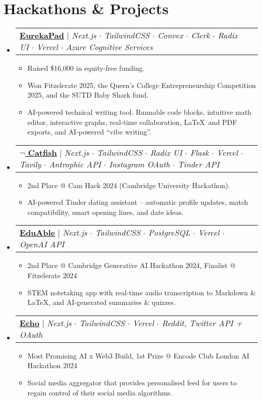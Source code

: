 \documentclass[letterpaper,10pt]{article}
\makeatletter
\newcommand{\link}[2]{\href{#1}{\color{blue}\underline{#2}}}
\newcommand{\resumeItem}[1]{
  \item\small{
    {#1 \vspace{-2pt}}
  }
}
\newcommand{\resumeProjectHeading}[2]{
  \item
  \begin{tabular*}{0.97\textwidth}{l@{\extracolsep{\fill}}r}
    \small#1 & #2 \\
  \end{tabular*}\vspace{-7pt}
}
\newenvironment{resumeSubHeadingList}{\begin{itemize}[leftmargin=0.15in, label={}]}{\end{itemize}}
\newenvironment{resumeItemList}{\begin{itemize}}{\end{itemize}}
\makeatother
\begin{document}
\section{Hackathons \& Projects}
\begin{resumeSubHeadingList}

  \resumeProjectHeading{
    \link{https://www.eurekapad.app/}{\textbf{EurekaPad}} $|$
    \emph{Next.js $\cdot$ TailwindCSS $\cdot$ Convex $\cdot$ Clerk $\cdot$
          Radix UI $\cdot$ Vercel $\cdot$ Azure Cognitive Services}}{}
  \begin{resumeItemList}
    \resumeItem{Raised \$16,000 in equity-free funding.}
    \resumeItem{Won Fitzelerate 2025, the Queen's College Entrepreneurship
                Competition 2025, and the SUTD Baby Shark fund.}
    \resumeItem{AI-powered technical writing tool. Runnable code blocks,
                intuitive math editor, interactive graphs, real-time
                collaboration, \LaTeX\ and PDF exports, and AI-powered ``vibe
                writing''.}
  \end{resumeItemList}

  \resumeProjectHeading{
    \link{https://github.com/zeyu2001/camhack-frontend}{\textbf{$\lnot$
          Catfish}} $|$
    \emph{Next.js $\cdot$ TailwindCSS $\cdot$ Radix UI $\cdot$ Flask $\cdot$
          Vercel $\cdot$ Tavily $\cdot$ Antrophic API $\cdot$ Instagram OAuth
          $\cdot$ Tinder API}}{}
  \begin{resumeItemList}
    \resumeItem{2nd Place @ Cam Hack 2024 (Cambridge University Hackathon).}
    \resumeItem{AI-powered Tinder dating assistant -- automatic profile
                updates, match compatibility, smart opening lines, and date
                ideas.}
  \end{resumeItemList}

  \newpage

  \resumeProjectHeading{
    \link{https://github.com/zeyu2001/EduAble}{\textbf{EduAble}} $|$
    \emph{Next.js $\cdot$ TailwindCSS $\cdot$ PostgreSQL $\cdot$ Vercel $\cdot$
          OpenAI API}}{}
  \begin{resumeItemList}
    \resumeItem{2nd Place @ Cambridge Generative AI Hackathon 2024, Finalist @ Fitzelerate 2024}
    \resumeItem{STEM notetaking app with real-time audio transcription to
                Markdown \& LaTeX, and AI-generated summaries \& quizzes.}
  \end{resumeItemList}

  \resumeProjectHeading{
    \link{https://github.com/ECHO-LONDON/ECHO-Web}{\textbf{Echo}} $|$
    \emph{Next.js $\cdot$ TailwindCSS $\cdot$ Vercel $\cdot$ Reddit, Twitter
          API + OAuth}}{}
  \begin{resumeItemList}
    \resumeItem{Most Promising AI x Web3 Build, 1st Prize @ Encode Club London
                AI Hackathon 2024}
    \resumeItem{Social media aggregator that provides personalised feed for
                users to regain control of their social media algorithms.}
  \end{resumeItemList}


\end{resumeSubHeadingList}
\end{document}
